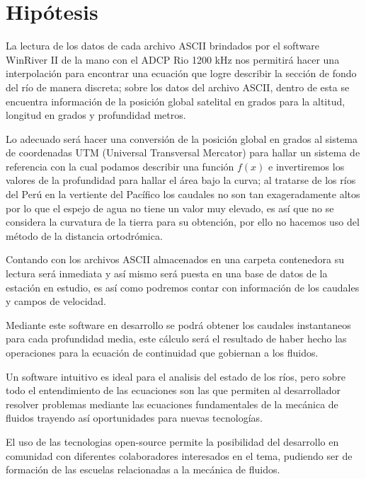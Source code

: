 \documentclass[12pt,a4paper]{report}
\begin{document}


\section{Hipótesis}
La lectura de los datos de cada archivo ASCII brindados por el software WinRiver II de la mano con el ADCP Rio 1200 kHz nos permitirá hacer una interpolación para encontrar una ecuación que logre describir la sección de fondo del río de manera discreta; sobre los datos del archivo ASCII, dentro de esta se encuentra información de la posición global satelital en grados para la altitud, longitud en grados y profundidad metros.

Lo adecuado será hacer una conversión de la posición global en grados al sistema de coordenadas UTM (Universal Transversal Mercator) para hallar un sistema de referencia con la cual podamos describir una función $ f(x) $ e invertiremos los valores de la profundidad para hallar el área bajo la curva; al tratarse de los ríos del Perú en la vertiente del Pacífico los caudales no son tan exageradamente altos por lo que el espejo de agua no tiene un valor muy elevado, es así que no se considera la curvatura de la tierra para su obtención, por ello no hacemos uso del método de la distancia ortodrómica.

Contando con los archivos ASCII almacenados en una carpeta contenedora su lectura será inmediata y así mismo será puesta en una base de datos de la estación en estudio, es así como podremos contar con información de los caudales y campos de velocidad.

Mediante este software en desarrollo se podrá obtener los caudales instantaneos para cada profundidad media, este cálculo será el resultado de haber hecho las operaciones para la ecuación de continuidad que gobiernan a los fluidos.

Un software intuitivo es ideal para el analisis del estado de los ríos, pero sobre todo el entendimiento de las ecuaciones son las que permiten al desarrollador resolver problemas mediante las ecuaciones fundamentales de la mecánica de fluidos trayendo así oportunidades para nuevas tecnologías.

El uso de las tecnologias open-source permite la posibilidad del desarrollo en comunidad con diferentes colaboradores interesados en el tema, pudiendo ser de formación de las escuelas relacionadas a la mecánica de fluidos.
\end{document}
